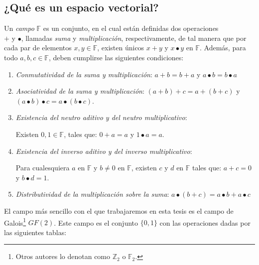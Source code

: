         \subsection{¿Qué es un espacio vectorial?}
            Un \textit{campo} $\mathbb{F}$ es un conjunto, en el cual están definidas dos operaciones \\ $+$ y $\bullet$, llamadas \textit{suma} y \textit{multiplicación}, respectivamente, de tal manera que por cada par de elementos $x,y \in \mathbb{F}$, existen únicos $x+y$ y $x \bullet y$ en $\mathbb{F}$. Además, para todo $a,b,c \in \mathbb{F}$, deben cumplirse las siguientes condiciones: 
                \begin{enumerate}
                    \item \textit{Conmutatividad de la suma y multiplicación}:
                        $a + b = b + a$  y  $a \bullet b = b \bullet a$
                    \item \textit{Asociatividad de la suma y multiplicación}:
                        $(a + b) + c = a + (b + c)$  y  $(a \bullet b)\bullet c = a\bullet(b \bullet c)$.
                    \item \textit{Existencia del neutro aditivo y del neutro multiplicativo}:
    
                        Existen  $0, 1 \in\mathbb{F}$, tales que:
                         $0 + a = a$  y  $1 \bullet a = a$.
    
                    \item \textit{Existencia del inverso aditivo y del inverso multiplicativo}:
    
                        Para cualesquiera $a$ en $\mathbb{F}$ y  $b \neq 0$ en $\mathbb{F}$, existen $c$ y $d$ en $\mathbb{F}$ tales que:
                        $a + c  =  0$  y  $b \bullet d  =  1$.
                        
                    \item \textit{Distributividad de la multiplicación sobre la suma}:
                        $a \bullet(b + c)  = a \bullet b  +  a \bullet c$
                 \end{enumerate}

            El campo más sencillo con el que trabajaremos en esta tesis es el campo de Galois\footnote{Otros autores lo denotan como $\mathbb{Z}_{2}$ o $\mathbb{F}_{2}$.} $GF(2)$. Este campo es el conjunto $\{0,1\}$ con las operaciones dadas por las siguientes tablas:

